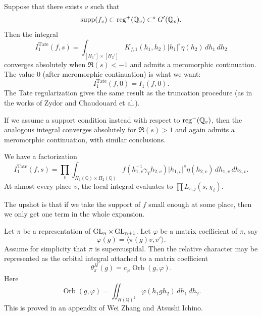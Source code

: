 \documentclass[reqno]{amsart} 
\begin{document}
Suppose that there exists $v$ such that
\begin{equation*}
  \operatorname{supp}(f_v) \subset \operatorname{reg}^+(\mathbb{Q}_v) \subset^o G '(\mathbb{Q}_v).
\end{equation*}
Then the integral
\begin{equation*}
  I_1^{\mathrm{Tate}}(f, s) = \int_{[H_1'] \times [H_2']}
  K_{f,1}(h_1, h_2) \lvert h_1 \rvert^s \eta(h_2) \, d h_1 \, d h_2
\end{equation*}
converges absolutely when $\Re(s) < -1$ and admits a meromorphic continuation.  The value $0$ (after meromorphic continuation) is what we want:
\begin{equation*}
  I_1^{\mathrm{Tate}}(f, 0) = I_1(f, 0).
\end{equation*}
The Tate regularization gives the same result as the truncation procedure (as in the works of Zydor and Chaudouard et al.).

If we assume a support condition instead with respect to $\operatorname{reg}^-(\mathbb{Q}_v)$, then the analogous integral converges absolutely for $\Re(s) > 1$ and again admits a meromorphic continuation, with similar conclusions.

We have a factorization
\begin{equation*}
  I_1^{\mathrm{Tate}}(f, s) = \prod_v \int_{H_1(\mathbb{Q} ) \times H_2(\mathbb{Q})} f(h_{1, v}^{-1} \gamma_T h_{2, v}) \lvert h_{1, v} \rvert^s \eta(h_{2, v}) \, d h_{1, v} \, d h_{2, v}.
\end{equation*}
At almost every place $v$, the local integral evaluates to $\prod L_{v , j}(s, \chi_i)$.

The upshot is that if we take the support of $f$ small enough at some place, then we only get one term in the whole expansion.

\begin{remark}\label{remark:cnfg5j2du3}
  Let $\pi$ be a representation of $\operatorname{GL}_n \times \operatorname{GL}_{n + 1}$.  Let $\varphi$ be a matrix coefficient of $\pi$, say
  \begin{equation*}
    \varphi(g) = \langle \pi(g) v, v' \rangle.
  \end{equation*}
  Assume for simplicity that $\pi$ is supercuspidal.  Then the relative character may be represented as the orbital integral attached to a matrix coefficient
  \begin{equation*}
    \theta_\pi^H(g) = c_\varphi \operatorname{Orb}(g, \varphi).
  \end{equation*}
  Here
  \begin{equation*}
    \operatorname{Orb}(g, \varphi) = \iint_{H(\mathbb{Q})^2} \varphi(h_1  g h_2) \, d h_1 \, d h_2.
  \end{equation*}
  This is proved in an appendix of Wei Zhang and Atsushi Ichino.
\end{remark}
\end{document}
